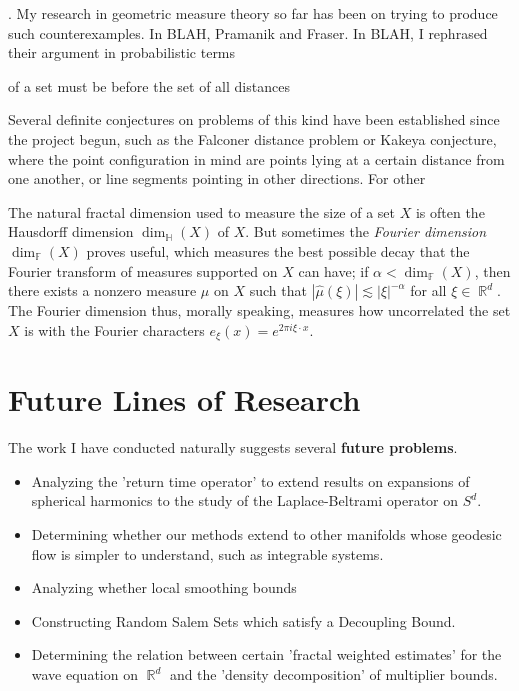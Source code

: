 \documentclass[12pt]{article}
\DeclareMathOperator{\RR}{\mathbb{R}}
\begin{document}
. My research in geometric measure theory so far has been on trying to produce such counterexamples. In BLAH, Pramanik and Fraser. In BLAH, I rephrased their argument in probabilistic terms 

 of a set must be before the set of all distances 

Several definite conjectures on problems of this kind have been established since the project begun, such as the Falconer distance problem or Kakeya conjecture, where the point configuration in mind are points lying at a certain distance from one another, or line segments pointing in other directions. For other

The natural fractal dimension used to measure the size of a set $X$ is often the Hausdorff dimension $\dim_{\mathbb{H}}(X)$ of $X$. But sometimes the \emph{Fourier dimension} $\dim_{\mathbb{F}}(X)$ proves useful, which measures the best possible decay that the Fourier transform of measures supported on $X$ can have; if $\alpha < \dim_{\mathbb{F}}(X)$, then there exists a nonzero measure $\mu$ on $X$ such that $|\widehat{\mu}(\xi)| \lesssim |\xi|^{-\alpha}$ for all $\xi \in \RR^d$. The Fourier dimension thus, morally speaking, measures how uncorrelated the set $X$ is with the Fourier characters $e_\xi(x) = e^{2 \pi i \xi \cdot x}$.

\section*{Future Lines of Research}

The work I have conducted naturally suggests several {\bf future problems}.
%
\begin{itemize}
	\item Analyzing the 'return time operator' to extend results on expansions of spherical harmonics to the study of the Laplace-Beltrami operator on $S^d$.

	\item Determining whether our methods extend to other manifolds whose geodesic flow is simpler to understand, such as integrable systems.

	\item Analyzing whether local smoothing bounds

	\item Constructing Random Salem Sets which satisfy a Decoupling Bound.

	\item Determining the relation between certain 'fractal weighted estimates' for the wave equation on $\RR^d$ and the 'density decomposition' of multiplier bounds.
\end{itemize}
\end{document}
